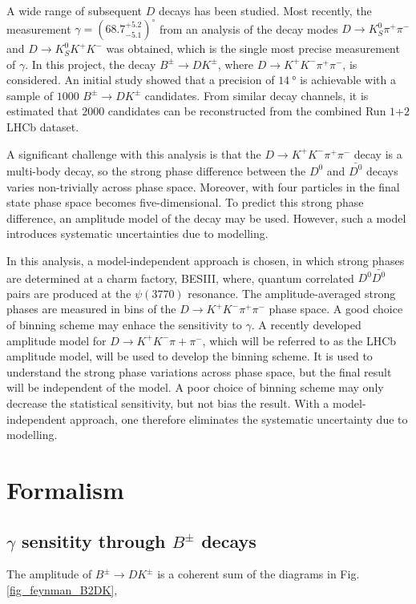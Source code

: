\documentclass[12pt, a4paper, notitlepage, onecolumn]{article}
\numberwithin{equation}{section}
\begin{document}
A wide range of subsequent $D$ decays has been studied. Most recently, the measurement $\gamma = (68.7^{+5.2}_{-5.1})^\circ$ from an analysis of the decay modes $D\to K_S^0\pi^+\pi^-$ and $D\to K_S^0K^+K^-$ was obtained\cite{cite_LHCbGGSZKSpipi}, which is the single most precise measurement of $\gamma$. In this project, the decay $B^\pm\to DK^\pm$, where $D\to K^+K^-\pi^+\pi^-$, is considered. An initial study\cite{cite_RademackerWilkinson} showed that a precision of $\SI{14}{\degree}$ is achievable with a sample of $1000$ $B^\pm\to DK^\pm$ candidates. From similar decay channels, it is estimated that $2000$ candidates can be reconstructed from the combined Run $1$+$2$ LHCb dataset.

A significant challenge with this analysis is that the $D\to K^+K^-\pi^+\pi^-$ decay is a multi-body decay, so the strong phase difference between the $D^0$ and $\bar{D^0}$ decays varies non-trivially across phase space. Moreover, with four particles in the final state phase space becomes five-dimensional. To predict this strong phase difference, an amplitude model of the decay may be used. However, such a model introduces systematic uncertainties due to modelling.

In this analysis, a model-independent approach is chosen, in which strong phases are determined at a charm factory, BESIII, where, quantum correlated $D^0\bar{D^0}$ pairs are produced at the $\psi(3770)$ resonance. The amplitude-averaged strong phases are measured in bins of the $D\to K^+K^-\pi^+\pi^-$ phase space. A good choice of binning scheme may enhace the sensitivity to $\gamma$. A recently developed amplitude model\cite{cite_AmplitudeModel} for $D\to K^+K^-\pi+\pi^-$, which will be referred to as the LHCb amplitude model, will be used to develop the binning scheme. It is used to understand the strong phase variations across phase space, but the final result will be independent of the model. A poor choice of binning scheme may only decrease the statistical sensitivity, but not bias the result. With a model-independent approach, one therefore eliminates the systematic uncertainty due to modelling.

\section{Formalism}
\subsection{\texorpdfstring{$\gamma$}{gamma} sensitity through \texorpdfstring{$B^\pm$}{B} decays}
The amplitude of $B^\pm\to DK^\pm$ is a coherent sum of the diagrams in Fig. \ref{fig_feynman_B2DK},
\end{document}
